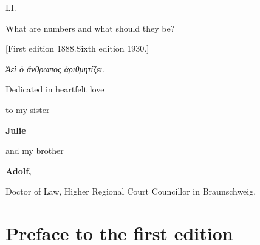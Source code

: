 \documentclass[11pt]{article}
\begin{document}
\begin{center}
{\Large LI.}\par\vspace{0.4em}
{\LARGE What are numbers and what should they be?}\par
{[First edition 1888.\quad Sixth edition 1930.]}\par\vspace{0.8em}
{\itshape Ἀεὶ ὁ ἄνθρωπος ἀριθμητίζει.}\par
\vspace{1.5em}
Dedicated in heartfelt love\par
to my sister\par
{\bfseries Julie}\par
and my brother\par
{\bfseries Adolf,}\par
Doctor of Law, Higher Regional Court Councillor in Braunschweig.
\end{center}

\section*{Preface to the first edition}
\end{document}
